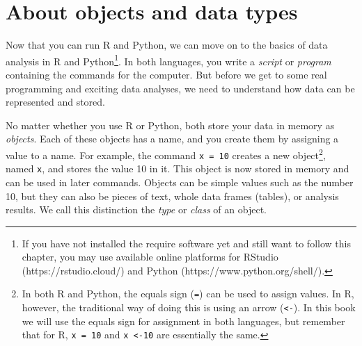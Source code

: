 \newcommand{\fnarrow}{\footnote{In both R and Python, the equals
  sign (\texttt{=}) can be used to assign values. In R, however, the
  traditional way of doing this is using an arrow (\texttt{\textless-}). In
  this book we will use the equals sign for assignment in both
  languages, but remember that for R, \texttt{x = 10} and
  \texttt{x \textless-10} are essentially the same.}}


\section{About objects and data types}
\label{sec:datatypes}

Now that you can run R and Python, we
can move on to the basics of data analysis in R and
Python\footnote{If you have not installed the require software yet and
  still want to follow this chapter, you may use available online
  platforms for RStudio (https://rstudio.cloud/) and Python
  (https://www.python.org/shell/).}.  In both languages, you write a
\emph{script} or \emph{program} containing the commands for the
computer.  But before we get to
some real programming and exciting data analyses, we need to understand
how data can be represented and stored.

No matter whether you use R or Python, both store your data in memory as \emph{objects}.
Each of these objects has a name, and you create them by
assigning a value to a name. For example, the command \texttt{x = 10}
creates a new object\fnarrow, named \texttt{x}, and stores the value 10
in it.  This object is now stored in memory and can be used in later
commands. Objects can be simple values such as the number 10, but they can also
be pieces of text, whole data frames (tables), or analysis results.
We call this distinction the \emph{type} or \emph{class} of an
object. 


